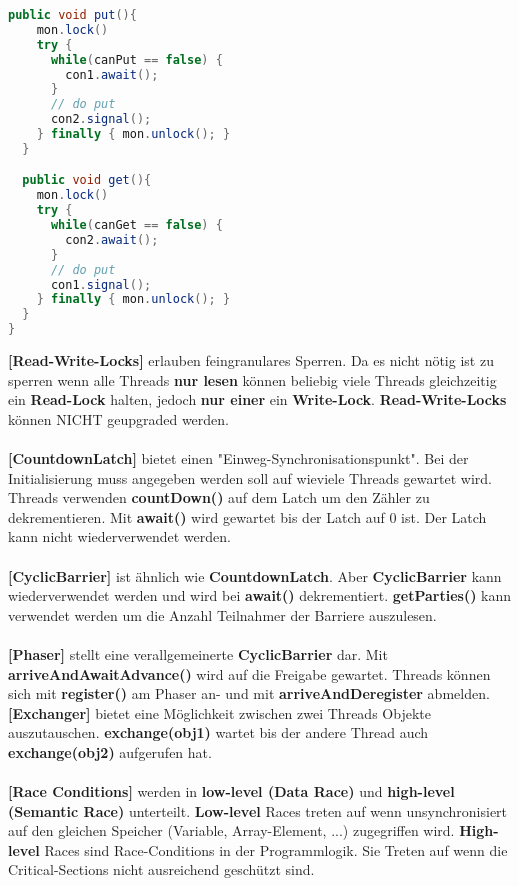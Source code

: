 \documentclass[8pt]{extarticle}
\let\oldtextbf\textbf
\renewcommand{\textbf}{\tiny\oldtextbf}
\begin{document}
\begin{multicols*}{5}
\begin{lstlisting}[language=java]
  public void put(){
    mon.lock()
    try {
      while(canPut == false) {
        con1.await();
      }
      // do put
      con2.signal();
    } finally { mon.unlock(); }
  }

  public void get(){
    mon.lock()
    try {
      while(canGet == false) {
        con2.await();
      }
      // do put
      con1.signal();
    } finally { mon.unlock(); }
  }
}
\end{lstlisting}
\textbf{[Read-Write-Locks]} erlauben feingranulares Sperren. Da es nicht nötig ist zu sperren wenn alle Threads \textbf{nur lesen} können beliebig viele Threads gleichzeitig ein \textbf{Read-Lock} halten, jedoch \textbf{nur einer} ein \textbf{Write-Lock}. \textbf{Read-Write-Locks} können NICHT geupgraded werden.\\\\
\textbf{[CountdownLatch]} bietet einen "Einweg-Synchronisationspunkt". Bei der Initialisierung muss angegeben werden soll auf wieviele Threads gewartet wird. Threads verwenden \textbf{countDown()} auf dem Latch um den Zähler zu dekrementieren. Mit \textbf{await()} wird gewartet bis der Latch auf 0 ist. Der Latch kann nicht wiederverwendet werden.\\\\
\textbf{[CyclicBarrier]} ist ähnlich wie \textbf{CountdownLatch}. Aber \textbf{CyclicBarrier} kann wiederverwendet werden und wird bei \textbf{await()} dekrementiert. \textbf{getParties()} kann verwendet werden um die Anzahl Teilnahmer der Barriere auszulesen.\\\\
\textbf{[Phaser]} stellt eine verallgemeinerte \textbf{CyclicBarrier} dar. Mit \textbf{arriveAndAwaitAdvance()} wird auf die Freigabe gewartet. Threads können sich mit \textbf{register()} am Phaser an- und mit \textbf{arriveAndDeregister} abmelden.\\
\textbf{[Exchanger]} bietet eine Möglichkeit zwischen zwei Threads Objekte auszutauschen. \textbf{exchange(obj1)} wartet bis der andere Thread auch \textbf{exchange(obj2)} aufgerufen hat.\\\\
\textbf{[Race Conditions]} werden in \textbf{low-level (Data Race)} und \textbf{high-level (Semantic Race)} unterteilt. \textbf{Low-level} Races treten auf wenn unsynchronisiert auf den gleichen Speicher (Variable, Array-Element, ...) zugegriffen wird. \textbf{High-level} Races sind Race-Conditions in der Programmlogik. Sie Treten auf wenn die Critical-Sections nicht ausreichend geschützt sind.\\\\

\end{multicols*}
\end{document}
